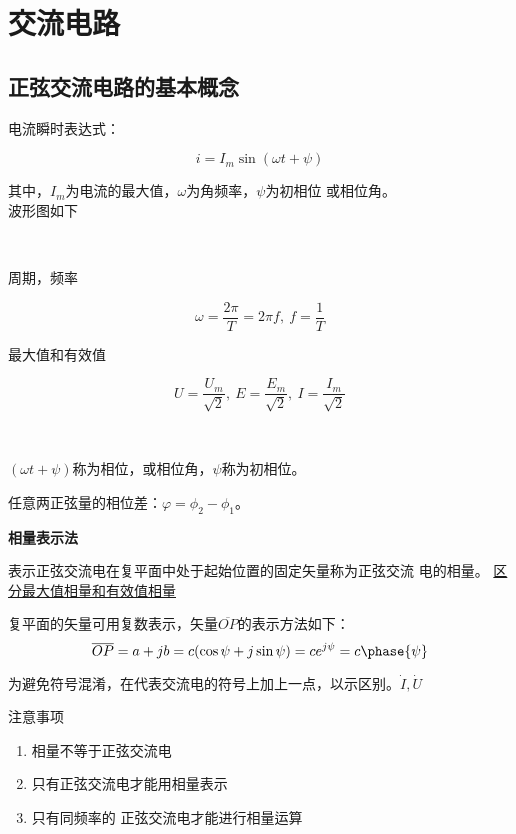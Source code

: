 \section{交流电路}

\subsection{正弦交流电路的基本概念}

电流瞬时表达式：

\[
    i=I_m\sin(\omega t+\psi)
\]

其中，$I_m$为电流的最大值，$\omega$为角频率，$\psi$为初相位
或相位角。\\
波形图如下




\

周期，频率

\[
    \omega=\frac{2\pi}{T}=2\pi f,~ f=\frac{1}{T}    
\]

最大值和有效值

\[
    U = \frac{U_m}{\sqrt{2}} ,~ 
    E = \frac{E_m}{\sqrt{2}} ,~
    I=\frac{I_m}{\sqrt{2}}
\]

\

$(\omega t + \psi)$称为相位，或相位角，$\psi$称为初相位。

任意两正弦量的相位差：$\varphi = \phi_2 - \phi_1$。

\large{\textbf{相量表示法}}

\normalsize
表示正弦交流电在复平面中处于起始位置的固定矢量称为正弦交流
电的相量。
\underline{
区分最大值相量和有效值相量
}

复平面的矢量可用复数表示，矢量$\overline{OP}$的表示方法如下：
\[
    \overline{OP}=a+jb = c(\cos \psi + j\sin \psi ) = ce^{j\psi}=c\phase{\psi}
\]

为避免符号混淆，在代表交流电的符号上加上一点，以示区别。$\dot{I},\dot{U}$

\large 注意事项
\normalsize
\begin{enumerate}
    \item 相量不等于正弦交流电
    \item 只有正弦交流电才能用相量表示
    \item 只有同频率的
    正弦交流电才能进行相量运算
\end{enumerate}

